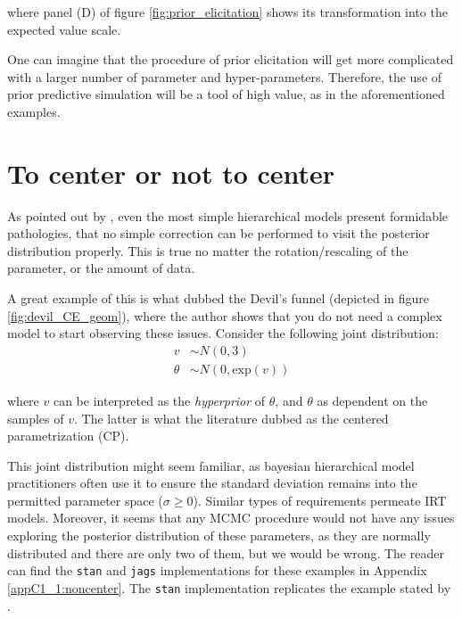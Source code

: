 \noindent where panel (D) of figure \ref{fig:prior_elicitation} shows its transformation into the expected value scale.

One can imagine that the procedure of prior elicitation will get more complicated with a larger number of parameter and hyper-parameters. Therefore, the use of prior predictive simulation will be a tool of high value, as in the aforementioned examples.




\section{To center or not to center} \label{sect:noncenter}

As pointed out by \citet{Betancourt_et_al_2013}, even the most simple hierarchical models present formidable pathologies, that no simple correction can be performed to visit the posterior distribution properly. This is true no matter the rotation/rescaling of the parameter, or the amount of data. 

A great example of this is what \citet{McElreath_2020} dubbed the Devil's funnel (depicted in figure \ref{fig:devil_CE_geom}), where the author shows that you do not need a complex model to start observing these issues. Consider the following joint distribution:
%
\begin{equation} \label{eq:devil}
	\begin{split}	
		v &\sim N(0, 3) \\
		\theta &\sim N(0, \text{exp}(v))
	\end{split}
\end{equation}

\noindent where $v$ can be interpreted as the \textit{hyperprior} of $\theta$, and $\theta$ as dependent on the samples of $v$. The latter is what the literature dubbed as the centered parametrization (CP).

This joint distribution might seem familiar, as bayesian hierarchical model practitioners often use it to ensure the standard deviation remains into the permitted parameter space ($\sigma \geq 0$). Similar types of requirements permeate IRT models. Moreover, it seems that any MCMC procedure would not have any issues exploring the posterior distribution of these parameters, as they are normally distributed and there are only two of them, but we would be wrong. The reader can find the \texttt{stan} and \texttt{jags} implementations for these examples in Appendix \ref{appC1_1:noncenter}. The \texttt{stan} implementation replicates the example stated by \citet{Betancourt_et_al_2013}.

